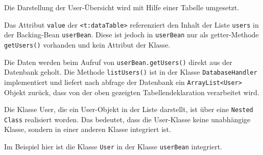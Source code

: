 Die Darstellung der User-Übersicht wird mit Hilfe einer Tabelle umgesetzt.

	

Das Attribut \texttt{value} der \texttt{<t:dataTable>} referenziert den Inhalt der Liste \texttt{users} in der Backing-Bean \texttt{userBean}. Diese ist jedoch in \texttt{userBean} nur als getter-Methode \texttt{getUsers()} vorhanden und kein Attribut der Klasse.

	

Die Daten werden beim Aufruf von \texttt{userBean.getUsers()} direkt aus der Datenbank geholt. Die Methode \texttt{listUsers()} ist in der Klasse \texttt{DatabaseHandler} implementiert und liefert nach abfrage der Datenbank ein \texttt{ArrayList<User>} Objekt zurück, dass von der oben gezeigten Tabellendeklaration verarbeitet wird.


Die Klasse User, die ein User-Objekt in der Liste darstellt, ist über eine \texttt{Nested Class} realisiert worden. Das bedeutet, dass die User-Klasse keine unabhängige Klasse, sondern in einer anderen Klasse integriert ist. 

Im Beispiel hier ist die Klasse \texttt{User} in der Klasse \texttt{userBean} integriert.

	
		
